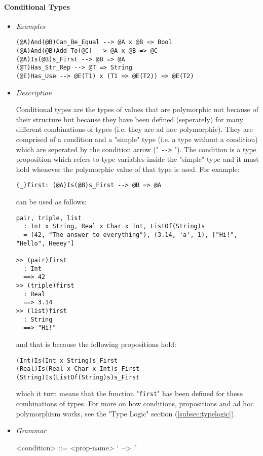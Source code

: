 \documentclass{article}
\begin{document}
\newpage

\paragraph{Conditional Types}

\begin{itemize}
\item \textit{Examples}
\begin{verbatim}
(@A)And(@B)Can_Be_Equal --> @A x @B => Bool
(@A)And(@B)Add_To(@C) --> @A x @B => @C
(@A)Is(@B)s_First --> @B => @A
(@T)Has_Str_Rep --> @T => String
(@E)Has_Use --> @E(T1) x (T1 => @E(T2)) => @E(T2)
\end{verbatim}

\item \textit{Description}

Conditional types are the types of values that are polymorphic not because of
their structure but because they have been defined (seperately) for many
different combinations of types (i.e. they are ad hoc polymorphic). They are
comprised of a condition and a "simple" type (i.e. a type without a condition)
which are seperated by the condition arrow (" \verb|-->| "). The condition is
a type proposition which refers to type variables inside the "simple" type and
it must hold whenever the polymorphic value of that type is used. For example:
\begin{verbatim}
(_)first: (@A)Is(@B)s_First --> @B => @A
\end{verbatim}
can be used as follows:
\begin{verbatim}
pair, triple, list
  : Int x String, Real x Char x Int, ListOf(String)s
  = (42, "The answer to everything"), (3.14, 'a', 1), ["Hi!", "Hello", Heeey"]

>> (pair)first
  : Int
  ==> 42
>> (triple)first
  : Real
  ==> 3.14
>> (list)first
  : String
  ==> "Hi!"
\end{verbatim}
and that is because the following propositions hold:
\begin{verbatim}
(Int)Is(Int x String)s_First
(Real)Is(Real x Char x Int)s_First
(String)Is(ListOf(String)s)s_First
\end{verbatim}
which it turn means that the function "\verb|first|" has been defined for these
combinations of types. For more on how conditions, propositions and ad hoc
polymorphism works, see the "Type Logic" section (\ref{subsec:typelogic}).

\item \textit{Grammar}
\begin{grammar}
<condition> ::= <prop-name> `\ -->\ '
\end{grammar}

\end{itemize}
\end{document}
